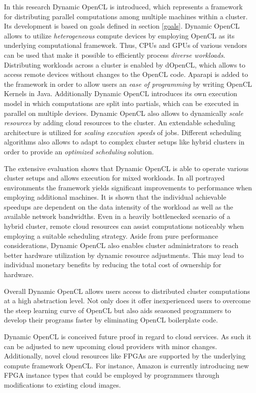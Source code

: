 In this research Dynamic OpenCL is introduced, which represents a framework for distributing parallel computations among multiple machines within a cluster. Its development is based on goals defined in section \ref{goals}. Dynamic OpenCL allows to utilize \textit{heterogeneous} compute devices by employing OpenCL as its underlying computational framework. Thus, CPUs and GPUs of various vendors can be used that make it possible to efficiently process \textit{diverse workloads}. Distributing workloads across a cluster is enabled by dOpenCL, which allows to access remote devices without changes to the OpenCL code. Aparapi is added to the framework in order to allow users an \textit{ease of programming} by writing OpenCL Kernels in Java. Additionally Dynamic OpenCL introduces its own execution model in which computations are split into partials, which can be executed in parallel on multiple devices. Dynamic OpenCL also allows to dynamically \textit{scale resources} by adding cloud resources to the cluster. An extendable scheduling architecture is utilized for \textit{scaling execution speeds} of jobs. Different scheduling algorithms also allows to adapt to complex cluster setups like hybrid clusters in order to provide an \textit{optimized scheduling} solution.

The extensive evaluation shows that Dynamic OpenCL is able to operate various cluster setups and allows execution for mixed workloads. In all portrayed environments the framework yields significant improvements to performance when employing additional machines. It is shown that the individual achievable speedups are dependent on the data intensity of the workload as well as the available network bandwidths. Even in a heavily bottlenecked scenario of a hybrid cluster, remote cloud resources can assist computations noticeably when employing a suitable scheduling strategy. Aside from pure performance considerations, Dynamic OpenCL also enables cluster administrators to reach better hardware utilization by dynamic resource adjustments. This may lead to individual monetary benefits by reducing the total cost of ownership for hardware.

Overall Dynamic OpenCL allows users access to distributed cluster computations at a high abstraction level. Not only does it offer inexperienced users to overcome the steep learning curve of OpenCL but also aids seasoned programmers to develop their programs faster by eliminating OpenCL boilerplate code.

Dynamic OpenCL is conceived future proof in regard to cloud services. As such it can be adjusted to new upcoming cloud providers with minor changes. Additionally, novel cloud resources like FPGAs are supported by the underlying compute framework OpenCL. For instance, Amazon is currently introducing new FPGA instance types\cite{amazon_fpga} that could be employed by programmers through modifications to existing cloud images.
